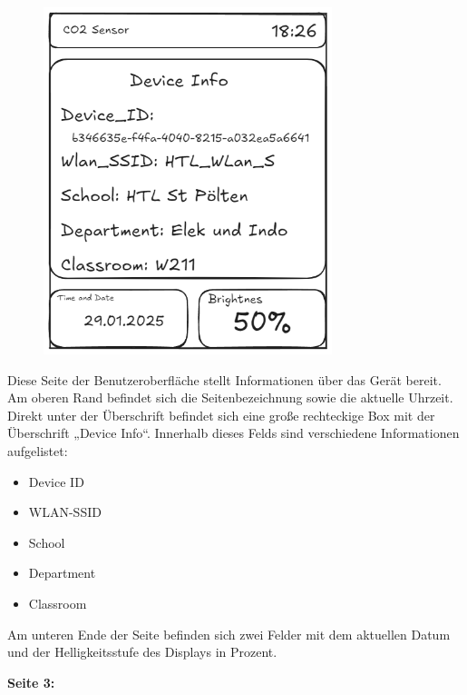 \begin{inhalt}
\begin{figure}[!htb]
\centering
\includegraphics[width=0.75\textwidth]{files/Tobias/pics/Skizzen/Screen2_Info.png}
\caption[Display Interface Skizze (Seite 2)]{}
\label{fig:display_skizze_seite_2}
\end{figure}

Diese Seite der Benutzeroberfläche stellt Informationen über das Gerät bereit. Am oberen Rand befindet sich die Seitenbezeichnung sowie die aktuelle Uhrzeit. Direkt unter der Überschrift befindet sich eine große rechteckige Box mit der Überschrift „Device Info“. Innerhalb dieses Felds sind verschiedene Informationen aufgelistet:
\begin{itemize}
    \item Device ID
    \item WLAN-SSID
    \item School
    \item Department
    \item Classroom
\end{itemize}

Am unteren Ende der Seite befinden sich zwei Felder mit dem aktuellen Datum und der Helligkeitsstufe des Displays in Prozent.

\begin{center}
    \textbf{Seite 3:}
\end{center}

\smallskip


\end{inhalt}
